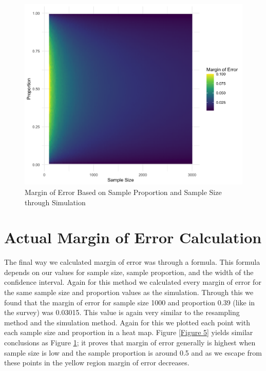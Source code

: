 \documentclass{article}\usepackage[]{graphicx}\usepackage[]{xcolor}
\begin{document}
\begin{multicols}{2}
\begin{figure}[H]
\begin{center}
\includegraphics[scale=0.14]{fourth.png}
\caption{Margin of Error Based on Sample Proportion and Sample Size through Simulation}
\label{Figure 4}
\end{center}
\end{figure}

\section{Actual Margin of Error Calculation}
The final way we calculated margin of error was through a formula. This formula depends on our values for sample size, sample proportion, and the width of the confidence interval. Again for this method we calculated every margin of error for the same sample size and proportion values as the simulation. Through this we found that the margin of error for sample size 1000 and proportion 0.39 (like in the survey) was 0.03015. This value is again very similar to the resampling method and the simulation method. Again for this we plotted each point with each sample size and proportion in a heat map. Figure \ref{Figure 5} yields similar conclusions as Figure \ref{Figure 4}; it proves that margin of error generally is highest when sample size is low and the sample proportion is around 0.5 and as we escape from these points in the yellow region margin of error decreases. 


\end{multicols}
\end{document}
